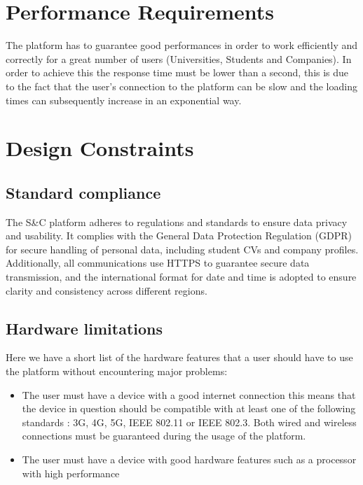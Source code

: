 \section{Performance Requirements}
\label{sec:performance_requirements}%
The platform has to guarantee good performances in order to work efficiently and correctly for a great number of users (Universities, Students and Companies). In order to achieve this the response time must be lower than a second, this is due to the fact that the user's connection to the platform can be slow and the loading times can subsequently increase in an exponential way.

\section{Design Constraints}
\label{sec:performance_requirements}%

\subsection{Standard compliance}
\label{subsec: standard_compliance}%
The S\&C platform adheres to regulations and standards to ensure data privacy and usability. It complies with the General Data Protection Regulation (GDPR) for secure handling of personal data, including student CVs and company profiles. Additionally, all communications use HTTPS to guarantee secure data transmission, and the international format for date and time is adopted to ensure clarity and consistency across different regions. 
\subsection{Hardware limitations}
\label{subsec: hardware_limitations}%
Here we have a short list of the hardware features that a user should have to use the platform without encountering major problems:
\begin{itemize}
    \item The user must have a device with a good internet connection this means that the device in question should be compatible with at least one of the following standards : 3G, 4G, 5G, IEEE 802.11 or IEEE 802.3. Both wired and wireless connections must be guaranteed during the usage of the platform.
    \item The user must have a device with good hardware features such as a processor with high performance 
\end{itemize}
 
